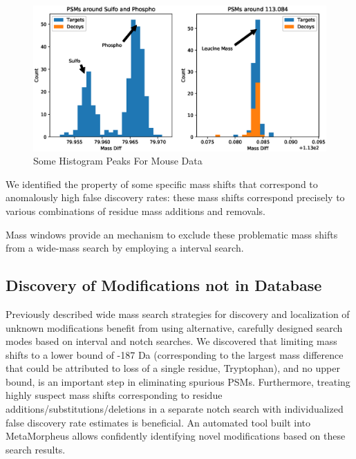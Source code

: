 \documentclass[journal=jprobs,manuscript=article]{achemso}
\begin{document}
\begin{figure}
\caption{Some Histogram Peaks For Mouse Data}
\label{fig:figure3}
\includegraphics[scale=0.6]{figure_3peaks}
\end{figure}

We identified the property of some specific mass shifts that correspond to anomalously high false discovery rates: these mass shifts correspond precisely to various combinations of residue mass additions and removals.

Mass windows provide an mechanism to exclude these problematic mass shifts from a wide-mass search by employing a interval search.

\subsection{Discovery of Modifications not in Database}

Previously described wide mass search strategies for discovery and localization of unknown modifications benefit from using alternative, carefully designed search modes based on interval and notch searches.
We discovered that limiting mass shifts to a lower bound of -187 Da (corresponding to the largest mass difference that could be attributed to loss of a single residue, Tryptophan), and no upper bound, is an important step in eliminating spurious PSMs.
Furthermore, treating highly suspect mass shifts corresponding to residue additions/substitutions/deletions in a separate notch search with individualized false discovery rate estimates is beneficial.
An automated tool built into MetaMorpheus allows confidently identifying novel modifications based on these search results.
\end{document}
